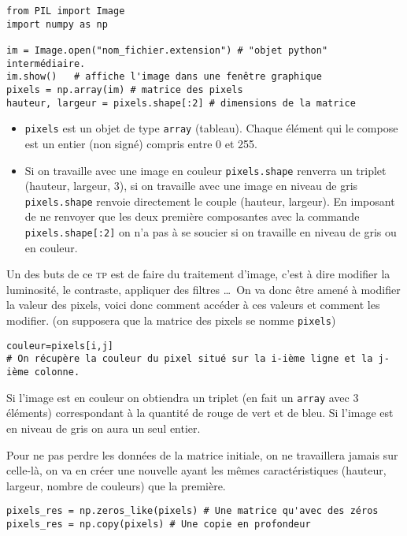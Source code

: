 \documentclass[10pt,a4paper,pdftex]{book}
\begin{document}
\begin{lstlisting}
from PIL import Image
import numpy as np

im = Image.open("nom_fichier.extension") # "objet python" intermédiaire.
im.show()	# affiche l'image dans une fenêtre graphique
pixels = np.array(im) # matrice des pixels
hauteur, largeur = pixels.shape[:2] # dimensions de la matrice
\end{lstlisting}

\Rqs 
\begin{itemize}
\item \texttt{pixels} est un objet de type \texttt{array} (tableau). Chaque élément qui le compose est un entier (non signé) compris entre 0 et 255.
\item Si on travaille avec une image en couleur \texttt{pixels.shape} renverra un triplet (hauteur, largeur, 3), si on travaille avec une image en niveau de gris \texttt{pixels.shape} renvoie directement le couple (hauteur, largeur). En imposant de ne renvoyer que les deux première composantes avec la commande \texttt{pixels.shape[:2]} on n'a pas à se soucier si on travaille en niveau de gris ou en couleur.
\end{itemize}



\bigskip
Un des buts de ce \textsc{tp} est de faire du traitement d'image, c'est à dire modifier la luminosité, le contraste, appliquer des filtres \ldots\ On va donc être amené à modifier la valeur des pixels, voici donc comment accéder à ces valeurs et comment les modifier. (on supposera que la matrice des pixels se nomme \texttt{pixels})

\begin{lstlisting}
couleur=pixels[i,j]
# On récupère la couleur du pixel situé sur la i-ième ligne et la j-ième colonne.
\end{lstlisting}
Si l'image est en couleur on obtiendra un triplet (en fait un \texttt{array} avec 3 éléments) correspondant à la quantité de rouge de vert et de bleu. Si l'image est en niveau de gris on aura un seul entier.

\medskip
Pour ne pas perdre les données de la matrice initiale, on ne travaillera jamais sur celle-là, on va en créer une nouvelle ayant les mêmes caractéristiques (hauteur, largeur, nombre de couleurs) que la première.
\begin{lstlisting}
pixels_res = np.zeros_like(pixels) # Une matrice qu'avec des zéros
pixels_res = np.copy(pixels) # Une copie en profondeur
\end{lstlisting}
\end{document}
